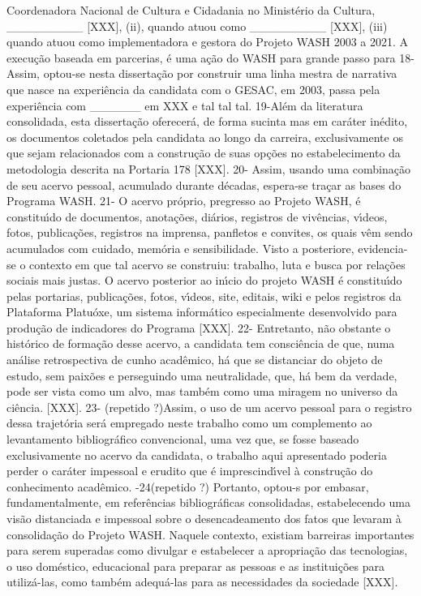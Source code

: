 \documentclass[
12pt,		%
openright,	%
twoside,  %
a4paper,			%
chapter=TITLE,		%
english,			%
french,				%
spanish,			%
brazil				%
]{USPSC-classe/USPSC}
\begin{document}
Coordenadora Nacional de Cultura e Cidadania no Minist\'erio da Cultura,   \_\_\_\_\_\_\_\_\_ [XXX], (ii), quando atuou como \_\_\_\_\_\_\_\_\_ [XXX], (iii) quando atuou como implementadora e gestora do Projeto WASH 2003 a 2021.
A execu\c{c}\~ao baseada em parcerias, \'e uma a\c{c}\~ao do WASH para grande passo para
18-  Assim, optou-se nesta disserta\c{c}\~ao por construir uma linha mestra de narrativa que nasce na experi\^encia da candidata com o GESAC, em 2003, passa pela experi\^encia com \_\_\_\_\_\_ em XXX e tal tal tal.
 19-Al\'em da literatura consolidada, esta disserta\c{c}\~ao oferecer\'a, de forma sucinta mas em car\'ater in\'edito, os documentos coletados pela candidata ao longo da carreira, exclusivamente os que sejam relacionados com a constru\c{c}\~ao de suas op\c{c}\~oes no estabelecimento da metodologia descrita na Portaria 178 [XXX].
20- Assim, usando uma combina\c{c}\~ao de seu acervo pessoal, acumulado durante d\'ecadas, espera-se tra\c{c}ar as bases do Programa WASH.
21-  O acervo pr\'oprio, pregresso ao Projeto WASH, \'e constitu\'{\i}do de documentos, anota\c{c}\~oes, di\'arios, registros de viv\^encias, v\'{\i}deos, fotos, publica\c{c}\~oes, registros na imprensa, panfletos e convites, os quais v\^em sendo acumulados com cuidado, mem\'oria e sensibilidade. Visto a posteriore, evidencia-se o contexto em que tal acervo se construiu: trabalho, luta e busca por rela\c{c}\~oes sociais mais justas. O acervo posterior ao in\'{\i}cio do projeto WASH \'e constitu\'{\i}do pelas portarias, publica\c{c}\~oes, fotos, v\'{\i}deos, site, editais, wiki e pelos registros da Plataforma Platu\'oxe, um sistema inform\'atico especialmente desenvolvido para produ\c{c}\~ao de indicadores do Programa [XXX].
22- Entretanto, n\~ao obstante o hist\'orico de forma\c{c}\~ao desse acervo, a candidata tem consci\^encia de que, numa an\'alise retrospectiva de cunho acad\^emico, h\'a que se distanciar do objeto de estudo, sem paix\~oes e perseguindo uma neutralidade, que, h\'a bem da verdade, pode ser vista como um alvo, mas tamb\'em como uma miragem no universo da ci\^encia. [XXX].
23- (repetido ?)Assim, o uso de um acervo pessoal para o registro dessa trajet\'oria ser\'a empregado neste trabalho como um complemento ao levantamento bibliogr\'afico convencional, uma vez que, se fosse baseado exclusivamente no acervo da candidata, o trabalho aqui apresentado poderia perder o car\'ater impessoal e erudito que \'e imprescind\'{\i}vel \`a constru\c{c}\~ao do conhecimento acad\^emico.
-24(repetido ?) Portanto, optou-s por embasar, fundamentalmente, em refer\^encias bibliogr\'aficas consolidadas, estabelecendo uma vis\~ao distanciada e impessoal sobre o desencadeamento dos fatos que levaram \`a consolida\c{c}\~ao do Projeto WASH.
Naquele contexto, existiam barreiras importantes para serem superadas como divulgar e estabelecer a apropria\c{c}\~ao das tecnologias, o uso dom\'estico, educacional para preparar as pessoas e as institui\c{c}\~oes para utiliz\'a-las, como tamb\'em adequ\'a-las para as necessidades da sociedade [XXX].
\postextual
\end{document}
